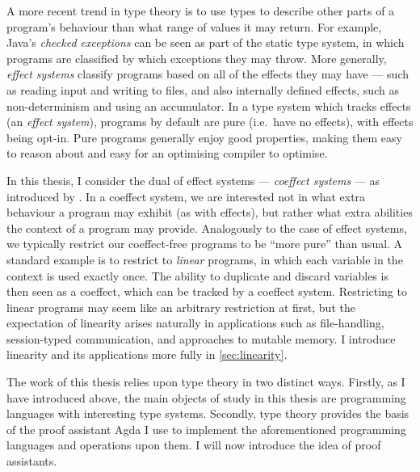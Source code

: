 A more recent trend in type theory is to use types to describe other parts of a
program's behaviour than what range of values it may return.
For example, Java's \emph{checked exceptions} can be seen as part of the static
type system, in which programs are classified by which exceptions they may
throw.
More generally, \emph{effect systems} classify programs based on all of the
effects they may have --- such as reading input and writing to files, and also
internally defined effects, such as non-determinism and using an accumulator.
In a type system which tracks effects (an \emph{effect system}), programs by
default are pure (i.e.\ have no effects), with effects being opt-in.
Pure programs generally enjoy good properties, making them easy to reason about
and easy for an optimising compiler to optimise.

In this thesis, I consider the dual of effect systems ---
\emph{coeffect systems} --- as introduced by \citet{POM14}.
In a coeffect system, we are interested not in what extra behaviour a program
may exhibit (as with effects), but rather what extra abilities the context of a
program may provide.
Analogously to the case of effect systems, we typically restrict our
coeffect-free programs to be ``more pure'' than usual.
A standard example is to restrict to \emph{linear} programs, in which each
variable in the context is used exactly once.
The ability to duplicate and discard variables is then seen as a coeffect, which
can be tracked by a coeffect system.
Restricting to linear programs may seem like an arbitrary restriction at first,
but the expectation of linearity arises naturally in applications such as
file-handling, session-typed communication, and approaches to mutable memory.
I introduce linearity and its applications more fully in \cref{sec:linearity}.



The work of this thesis relies upon type theory in two distinct ways.
Firstly, as I have introduced above, the main objects of study in this thesis
are programming languages with interesting type systems.
Secondly, type theory provides the basis of the proof assistant Agda I
use to implement the aforementioned programming languages and operations upon
them.
I will now introduce the idea of proof assistants.

